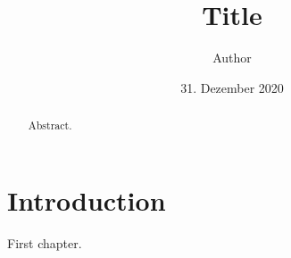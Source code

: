 \documentclass[english,algorithms,reviews,examples]{isasthesis}
\title{Title}
\author{Author}
\date{31. Dezember 2020}
\begin{document}
    \maketitle

    \begin{abstract}
        Abstract.
    \end{abstract}

    \maketoc
    
    \chapter{Introduction}
        First chapter.
\end{document}
